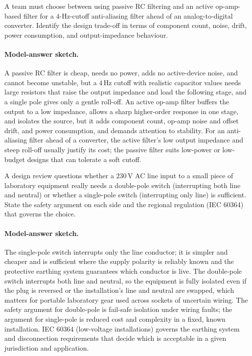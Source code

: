 \begin{exercise}
A team must choose between using passive RC filtering and an active
op-amp-based filter for a $4$-Hz-cutoff anti-aliasing filter ahead of
an analog-to-digital converter. Identify the design trade-off in
terms of component count, noise, drift, power consumption, and
output-impedance behaviour.
\paragraph{Model-answer sketch.}
A passive RC filter is cheap, needs no power, adds no active-device
noise, and cannot become unstable, but a $4\,\si{\hertz}$ cutoff with
realistic capacitor values needs large resistors that raise the output
impedance and load the following stage, and a single pole gives only a
gentle roll-off. An active op-amp filter buffers the output to a low
impedance, allows a sharp higher-order response in one stage, and
isolates the source, but it adds component count, op-amp noise and
offset drift, and power consumption, and demands attention to
stability. For an anti-aliasing filter ahead of a converter, the
active filter's low output impedance and steep roll-off usually justify
its cost; the passive filter suits low-power or low-budget designs that
can tolerate a soft cutoff.
\end{exercise}

\begin{exercise}
A design review questions whether a $230\,\si{\volt}$ AC line input
to a small piece of laboratory equipment really needs a double-pole
switch (interrupting both line and neutral) or whether a single-pole
switch (interrupting only line) is sufficient. State the safety
argument on each side and the regional regulation (IEC 60364) that
governs the choice.
\paragraph{Model-answer sketch.}
The single-pole switch interrupts only the line conductor; it is simpler
and cheaper and is sufficient where the supply polarity is reliably
known and the protective earthing system guarantees which conductor is
live. The double-pole switch interrupts both line and neutral, so the
equipment is fully isolated even if the plug is reversed or the
installation's line and neutral are swapped, which matters for portable
laboratory gear used across sockets of uncertain wiring. The safety
argument for double-pole is fail-safe isolation under wiring faults; the
argument for single-pole is reduced cost and complexity in a fixed,
known installation. IEC 60364 (low-voltage installations) governs the
earthing system and disconnection requirements that decide which is
acceptable in a given jurisdiction and application.
\end{exercise}
